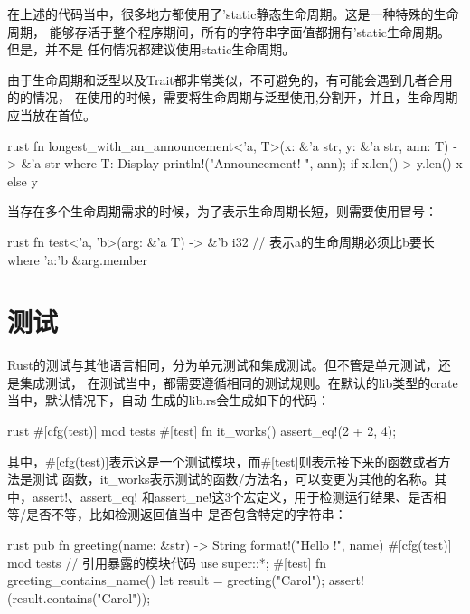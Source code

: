 在上述的代码当中，很多地方都使用了'static静态生命周期。这是一种特殊的生命周期，
能够存活于整个程序期间，所有的字符串字面值都拥有'static生命周期。但是，并不是
任何情况都建议使用static生命周期。

由于生命周期和泛型以及Trait都非常类似，不可避免的，有可能会遇到几者合用的的情况，
在使用的时候，需要将生命周期与泛型使用,分割开，并且，生命周期应当放在首位。
\begin{code-block}{rust}
fn longest_with_an_announcement<'a, T>(x: &'a str, y: &'a str, ann: T) -> &'a str
    where T: Display
{
    println!("Announcement! {}", ann);
    if x.len() > y.len() {
        x
    } else {
        y
    }
}
\end{code-block}

当存在多个生命周期需求的时候，为了表示生命周期长短，则需要使用冒号：
\begin{code-block}{rust}
fn test<'a, 'b>(arg: &'a T) -> &'b i32
// 表示a的生命周期必须比b要长
where 'a:'b
{
    &arg.member
}
\end{code-block}

\section{测试}
Rust的测试与其他语言相同，分为单元测试和集成测试。但不管是单元测试，还是集成测试，
在测试当中，都需要遵循相同的测试规则。在默认的lib类型的crate当中，默认情况下，自动
生成的lib.rs会生成如下的代码：
\begin{code-block}{rust}
#[cfg(test)]
mod tests {
    #[test]
    fn it_works() {
        assert_eq!(2 + 2, 4);
    }
}
\end{code-block}
其中，\#[cfg(test)]表示这是一个测试模块，而\#[test]则表示接下来的函数或者方法是测试
函数，it\_works表示测试的函数/方法名，可以变更为其他的名称。其中，assert!、assert\_eq!
和assert\_ne!这3个宏定义，用于检测运行结果、是否相等/是否不等，比如检测返回值当中
是否包含特定的字符串：
\begin{code-block}{rust}
pub fn greeting(name: &str) -> String {
    format!("Hello {}!", name)
}
#[cfg(test)]
mod tests {
    // 引用暴露的模块代码
    use super::*;
    #[test]
    fn greeting_contains_name() {
        let result = greeting("Carol");
        assert!(result.contains("Carol"));
    }
}
\end{code-block}

